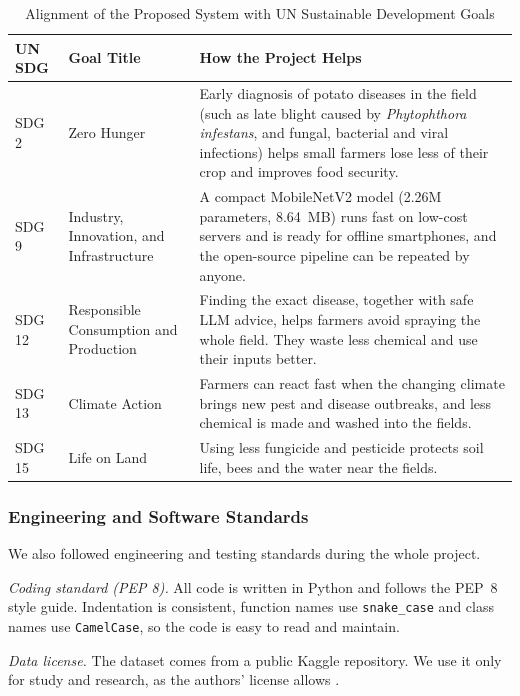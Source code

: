 \begin{table}[htbp]
\caption{Alignment of the Proposed System with UN Sustainable Development Goals}
\label{tab:sdg_alignment}
\begin{center}
\begin{tabularx}{\textwidth}{| p{2.3cm} | p{3.6cm} | X |}
\hline
\textbf{UN SDG} & \textbf{Goal Title} & \textbf{How the Project Helps} \\
\hline
SDG 2 & Zero Hunger & Early diagnosis of potato diseases in the field (such as late blight caused by \textit{Phytophthora infestans}, and fungal, bacterial and viral infections) helps small farmers lose less of their crop and improves food security. \\
\hline
SDG 9 & Industry, Innovation, and Infrastructure & A compact MobileNetV2 model (2.26M parameters, 8.64~MB) runs fast on low-cost servers and is ready for offline smartphones, and the open-source pipeline can be repeated by anyone. \\
\hline
SDG 12 & Responsible Consumption and Production & Finding the exact disease, together with safe LLM advice, helps farmers avoid spraying the whole field. They waste less chemical and use their inputs better. \\
\hline
SDG 13 & Climate Action & Farmers can react fast when the changing climate brings new pest and disease outbreaks, and less chemical is made and washed into the fields. \\
\hline
SDG 15 & Life on Land & Using less fungicide and pesticide protects soil life, bees and the water near the fields. \\
\hline
\end{tabularx}
\end{center}
\end{table}

\subsubsection*{Engineering and Software Standards}
We also followed engineering and testing standards during the whole project.

\textit{Coding standard (PEP 8).} All code is written in Python and follows the PEP~8 style guide. Indentation is consistent, function names use \texttt{snake\_case} and class names use \texttt{CamelCase}, so the code is easy to read and maintain.

\textit{Data license.} The dataset comes from a public Kaggle repository. We use it only for study and research, as the authors' license allows \cite{shabrina2024novel}.

